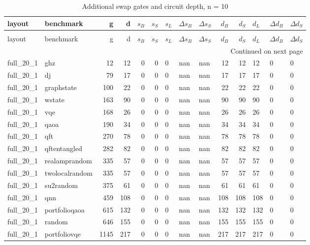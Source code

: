\begin{longtable}{llrrrrlllrrlll}
\caption{Additional swap gates and circuit depth, n = 10} \label{benchmark-table-10} \\
\toprule
layout & benchmark & g & d & $s_B$ & $s_S$ & $s_L$ & $\Delta s_B$ & $\Delta s_S$ & $d_B$ & $d_S$ & $d_L$ & $\Delta d_B$ & $\Delta d_S$ \\
\midrule
\endfirsthead
\caption[]{Additional swap gates and circuit depth, n = 10} \\
\toprule
layout & benchmark & g & d & $s_B$ & $s_S$ & $s_L$ & $\Delta s_B$ & $\Delta s_S$ & $d_B$ & $d_S$ & $d_L$ & $\Delta d_B$ & $\Delta d_S$ \\
\midrule
\endhead
\midrule
\multicolumn{14}{r}{Continued on next page} \\
\midrule
\endfoot
\bottomrule
\endlastfoot
full\_20\_1 & ghz & 12 & 12 & 0 & 0 & 0 & nan & nan & 12 & 12 & 12 & 0 & 0 \\
full\_20\_1 & dj & 79 & 17 & 0 & 0 & 0 & nan & nan & 17 & 17 & 17 & 0 & 0 \\
full\_20\_1 & graphstate & 100 & 22 & 0 & 0 & 0 & nan & nan & 22 & 22 & 22 & 0 & 0 \\
full\_20\_1 & wstate & 163 & 90 & 0 & 0 & 0 & nan & nan & 90 & 90 & 90 & 0 & 0 \\
full\_20\_1 & vqe & 168 & 26 & 0 & 0 & 0 & nan & nan & 26 & 26 & 26 & 0 & 0 \\
full\_20\_1 & qaoa & 190 & 34 & 0 & 0 & 0 & nan & nan & 34 & 34 & 34 & 0 & 0 \\
full\_20\_1 & qft & 270 & 78 & 0 & 0 & 0 & nan & nan & 78 & 78 & 78 & 0 & 0 \\
full\_20\_1 & qftentangled & 282 & 82 & 0 & 0 & 0 & nan & nan & 82 & 82 & 82 & 0 & 0 \\
full\_20\_1 & realamprandom & 335 & 57 & 0 & 0 & 0 & nan & nan & 57 & 57 & 57 & 0 & 0 \\
full\_20\_1 & twolocalrandom & 335 & 57 & 0 & 0 & 0 & nan & nan & 57 & 57 & 57 & 0 & 0 \\
full\_20\_1 & su2random & 375 & 61 & 0 & 0 & 0 & nan & nan & 61 & 61 & 61 & 0 & 0 \\
full\_20\_1 & qnn & 459 & 108 & 0 & 0 & 0 & nan & nan & 108 & 108 & 108 & 0 & 0 \\
full\_20\_1 & portfolioqaoa & 615 & 132 & 0 & 0 & 0 & nan & nan & 132 & 132 & 132 & 0 & 0 \\
full\_20\_1 & random & 646 & 155 & 0 & 0 & 0 & nan & nan & 155 & 155 & 155 & 0 & 0 \\
full\_20\_1 & portfoliovqe & 1145 & 217 & 0 & 0 & 0 & nan & nan & 217 & 217 & 217 & 0 & 0 \\

\end{longtable}
